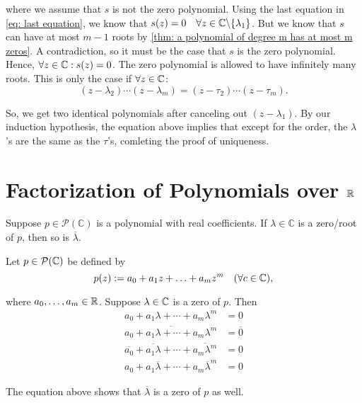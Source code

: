\begin{prf}
  where we assume that $s$ is not the zero polynomial. Using the last equation in \eqref{eq: last equation}, we know that $s(z) = 0 \quad \forall z \in \mathbb{C} \backslash \{\lambda_1\}$. But we know that $s$ can have at most $m-1$ roots by \ref{thm: a polynomial of degree m has at most m zeros}. A contradiction, so it must be the case that $s$ is the zero polynomial. Hence, $\forall z \in \mathbb{C}: s(z) = 0$. The zero polynomial is allowed to have infinitely many roots. This is only the case if $\forall z \in \mathbb{C}$:
   \[
     (z - \lambda_2) \cdots (z-\lambda_m) = (z - \tau_2) \cdots (z-\tau_m).
   \]

   So, we get two identical polynomials after canceling out $(z-\lambda_1)$. By our induction hypothesis, the equation above implies that except for the order, the $\lambda$'s are the same as the $\tau$'s, comleting the proof of uniqueness.
\end{prf}

\section{Factorization of Polynomials over \texorpdfstring{$\mathbb{R}$}{R}}

\begin{thm}
  \label{thm: polynomials with real coefficients have nonreal zeros in pairs}
  Suppose $p\in \mathcal{P} (\mathbb{C})$ is a polynomial with real coefficients. If $\lambda \in \mathbb{C}$ is a zero/root of $p$, then so is $\overline{\lambda}$.
\end{thm}
\begin{prf}
  Let $p \in \mathcal{P}(\mathbb{C})$ be defined by
  \begin{equation}
    p(z) := a_0 + a_1 z + \ldots + a_m z^m \quad (\forall c \in  \mathbb{C}),
  \end{equation}

  where $a_0, \ldots, a_m \in \mathbb{R}$. Suppose $\lambda \in \mathbb{C}$ is a zero of $p$. Then
  \begin{equation}
    \begin{aligned}
      a_0+a_1\lambda+\cdots+a_m\lambda^m&=0\\
      \overline{a_0+a_1\lambda+\cdots+a_m\lambda^m}&=\overline{0}\\
      \overline{a_0}+\overline{a_1\lambda}+\cdots+\overline{a_m\lambda^m}&=0\\
      a_0+a_1\overline{\lambda}+\cdots+a_m\overline{\lambda}^m&=0
    \end{aligned}
  \end{equation}

  The equation above shows that $\overline{\lambda}$ is a zero of $p$ as well.
\end{prf}

